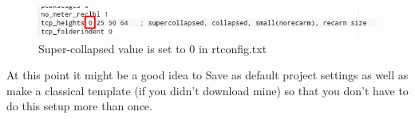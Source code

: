 \documentclass[10pt,american]{article}
\begin{document}
\begin{figure}
\begin{centering}
\includegraphics[width=1\linewidth]{user_guide_images/super-collapsed}
\par\end{centering} \caption{\label{fig:Super-collapsed-value-is}Super-collapsed
value is set to 0 in rtconfig.txt}
\end{figure}

\noindent\begin{flushleft} At this point it might be a good idea to Save as
default project settings as well as make a classical template (if you didn't
download mine) so that you don't have to do this setup more than once.
\par\end{flushleft}

\pagebreak
\end{document}
